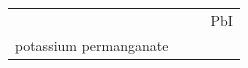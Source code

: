 \begin{enumerate}[noitemsep, label=\textbf{\arabic*}. ]
{\begin{tabular}[t]{|l|l|l|l|}
    
         &
    
    
         &
    
    
         &
    
    
        \begin{math}\mathrm{PbI}\end{math}%
     \tabularnewline\cline{1-1}\cline{2-2}\cline{3-3}\cline{4-4}
    
    
        potassium permanganate &
    
    
         &
    
    
         &
    
    
     \tabularnewline\cline{1-1}\cline{2-2}\cline{3-3}\cline{4-4}
    

\end{tabular}}
\end{enumerate}
